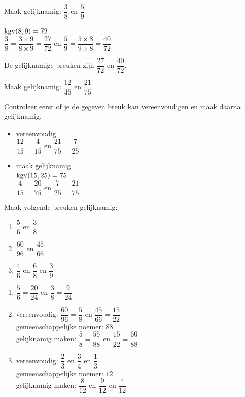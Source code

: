 \documentclass{bis}
\begin{document}
\begin{voorbeeld}
Maak gelijknamig: $\dfrac{3}{8}$ en $\dfrac{5}{9}$

$\kgv(8,9)=72$\\

$\dfrac{3}{8}= \dfrac{3\times 9}{8\times 9}=\dfrac{27}{72}$ en
$\dfrac{5}{9}= \dfrac{5\times 8}{9\times 8}=\dfrac{40}{72}$

De gelijknamige breuken zijn $\dfrac{27}{72}$ en $\dfrac{40}{72}$.
\end{voorbeeld}

\begin{voorbeeld}
Maak gelijknamig: $\dfrac{12}{45}$ en $\dfrac{21}{75}$

Controleer eerst of je de gegeven breuk kan vereenvoudigen en maak daarna gelijknamig.

\begin{itemize}
  \item vereenvoudig\\
  $\dfrac{12}{45}=\dfrac{4}{15}$ en $\dfrac{21}{75}=\dfrac{7}{25}$
  \item maak gelijknamig\\
  $\kgv(15,25)=75$\\
  $\dfrac{4}{15}= \dfrac{20}{75}$ en
  $\dfrac{7}{25}= \dfrac{21}{75}$
\end{itemize}
\end{voorbeeld}

\begin{exercise}
Maak volgende breuken gelijknamig:
\begin{enumerate}
  \item $\dfrac{5}{6}$ en $\dfrac{3}{8}$
  \item $\dfrac{60}{96}$ en $\dfrac{45}{66}$
  \item $\dfrac{4}{6}$ en $\dfrac{6}{8}$ en $\dfrac{3}{9}$
\end{enumerate}
\end{exercise}

\begin{solution}
\begin{enumerate}
  \item $\dfrac{5}{6}=\dfrac{20}{24}$ en $\dfrac{3}{8}=\dfrac{9}{24}$
  \item vereenvoudig: $\dfrac{60}{96}=\dfrac{5}{8}$ en $\dfrac{45}{66}=\dfrac{15}{22}$\\
  gemeenschappelijke noemer: $88$\\
  gelijknamig maken: $\dfrac{5}{8}=\dfrac{55}{88}$ en $\dfrac{15}{22}=\dfrac{60}{88}$
  \item vereenvoudig: $\dfrac{2}{3}$ en $\dfrac{3}{4}$ en $\dfrac{1}{3}$\\
  gemeenschappelijke noemer: $12$\\
  gelijknamig maken: $\dfrac{8}{12}$ en $\dfrac{9}{12}$ en $\dfrac{4}{12}$\\
\end{enumerate}
\end{solution}
\end{document}
